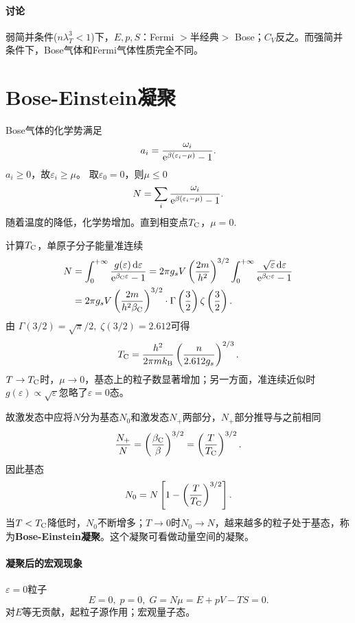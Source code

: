 \paragraph{讨论}弱简并条件($n\lambda_T^3<1$)下，$E,p,S$：Fermi $>$半经典$>$ Bose；$C_V$反之。而强简并条件下，Bose气体和Fermi气体性质完全不同。
\section{Bose-Einstein凝聚}
Bose气体的化学势满足
\[
	a_i=\frac{\omega_i}{\mathop{}\!\mathrm{e}^{\beta(\varepsilon_i-\mu)}-1}.
\]
$a_i\geqslant 0$，故$\varepsilon_i\geqslant \mu$。
取$\varepsilon_0=0$，则$\mu\leqslant 0$
\[
	N=\sum_i\frac{\omega_i}{\mathop{}\!\mathrm{e}^{\beta(\varepsilon_i-\mu)}-1}.
\]
随着温度的降低，化学势增加。直到相变点$T_\mathrm C$，$\mu=0$.

计算$T_\mathrm C$，单原子分子能量准连续
\begin{align*}
	N&=\int_0^{+\infty}\frac{g(\varepsilon)\mathop{}\!\mathrm{d}\varepsilon}{\mathop{}\!\mathrm{e}^{\beta_\mathrm C\varepsilon}-1}=2\pi g_sV\left(\frac{2m}{h^2}\right)^{3/2}\int_0^{+\infty}\frac{\sqrt\varepsilon\mathop{}\!\mathrm{d}\varepsilon}{\mathop{}\!\mathrm{e}^{\beta_\mathrm C\varepsilon}-1}\\
	&=2\pi g_sV\left(\frac{2m}{h^2\beta_\mathrm C}\right)^{3/2}\cdot\Gamma\left(\frac32\right)\zeta\left(\frac32\right).
\end{align*}
由
$\Gamma(3/2)=\sqrt\pi/2,\;\zeta(3/2)=2.612$可得
\begin{align}\label{Bose-TC}
	T_\mathrm C=\frac{h^2}{2\pi mk_{\mathrm B}}\left(\frac n{2.612g_s}\right)^{2/3}.
\end{align}
$T\to T_\mathrm C$时，$\mu\to0$，基态上的粒子数显著增加；另一方面，准连续近似时$g(\varepsilon)\propto\sqrt\varepsilon$忽略了$\varepsilon=0$态。

故激发态中应将$N$分为基态$N_0$和激发态$N_+$两部分，$N_+$部分推导与之前相同
\[
	\frac{N_+}N=\left(\frac{\beta_\mathrm C}\beta\right)^{3/2}=\left(\frac T{T_\mathrm C}\right)^{3/2}.
\]
因此基态
\begin{align}
	N_0=N\left[1-\left(\frac T{T_\mathrm C}\right)^{3/2}\right].
\end{align}
当$T<T_\mathrm C$降低时，$N_0$不断增多；$T\to 0$时$N_0\to N$，越来越多的粒子处于基态，称为\textbf{Bose-Einstein凝聚}。这个凝聚可看做动量空间的凝聚。

\paragraph{凝聚后的宏观现象}$\varepsilon=0$粒子
\[
	E=0,\;p=0,\;G=N\mu=E+pV-TS=0.
\]
对$E$等无贡献，起粒子源作用；宏观量子态。

